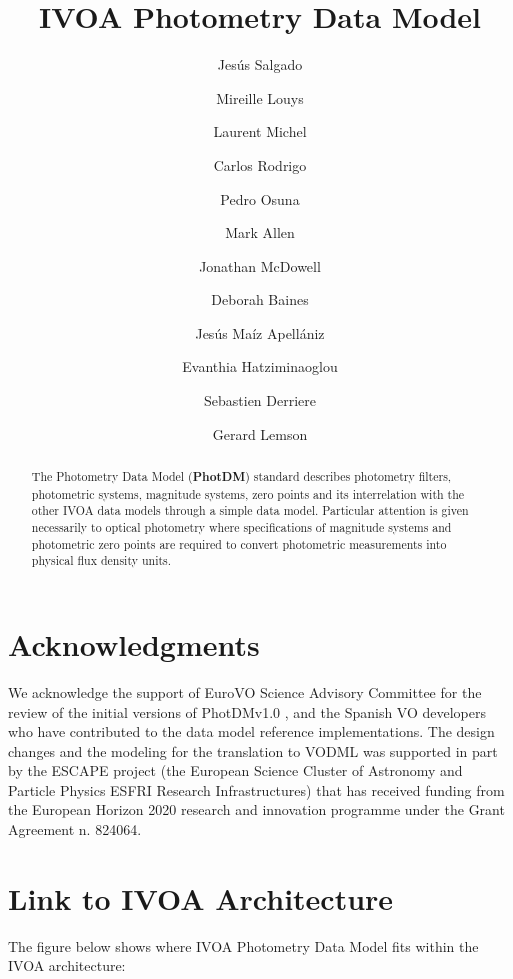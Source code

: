 \documentclass[11pt,a4paper]{ivoa}
\title{IVOA Photometry Data Model}
\author{Jesús Salgado}
\author{Mireille Louys}
\author{Laurent Michel}
\author{Carlos Rodrigo}
\author{Pedro Osuna}
\author{Mark Allen}
\author{Jonathan McDowell}
\author{Deborah Baines}
\author{Jesús Maíz Apellániz}
\author{Evanthia Hatziminaoglou}
\author{Sebastien \mbox{Derriere}}
\author{Gerard Lemson}
\begin{document}
\begin{abstract}
The Photometry Data Model (\textbf{PhotDM}) standard describes photometry
filters, photometric systems, magnitude systems, zero points and its
interrelation with the other IVOA data models through a simple data model.
Particular attention is given necessarily to optical photometry where
specifications of magnitude systems and photometric zero points are required
to convert photometric measurements into physical flux density units.
\end{abstract}

\section*{Acknowledgments}
We acknowledge the support of EuroVO Science Advisory Committee for the review of the
initial versions of PhotDMv1.0 , and the Spanish VO developers who have contributed
to the data model reference implementations.
The design changes and the modeling for the translation to VODML was supported in part by the
ESCAPE project (the European Science Cluster of Astronomy and Particle Physics ESFRI Research Infrastructures)
that has received funding from the European Horizon 2020 research and innovation programme under the Grant Agreement n. 824064.


\pagebreak

\section*{Link to IVOA Architecture}
The figure below shows where IVOA Photometry Data Model fits within the
IVOA architecture:


\end{document}
